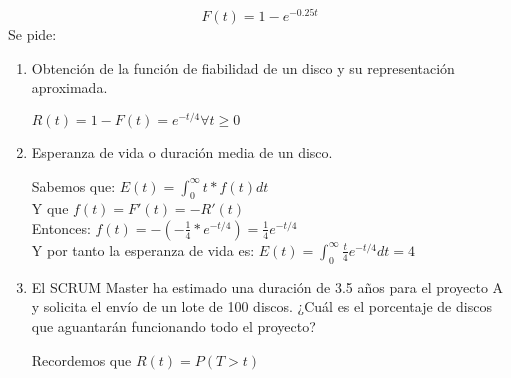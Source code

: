 \[F(t)=1-e^{-0.25t}\]
Se pide:
\begin{enumerate}
    \item Obtención de la función de fiabilidad de un disco y su representación aproximada.
    \begin{tcolorbox}[colback=white,colframe=cyan!50!black,fonttitle=\bfseries]
    $R(t) = 1 - F(t) = e^{-t/4}$\hspace{1cm}$\forall t \geq 0$\\
    \begin{center}
    \end{center}
        
    \end{tcolorbox}
    \item Esperanza de vida o duración media de un disco.
    \begin{tcolorbox}[colback=white,colframe=cyan!50!black,fonttitle=\bfseries]
    Sabemos que: $E(t)= \int_0^{\infty}t*f(t)dt$\\
    Y que $f(t) = F'(t) = -R'(t)$\\
    
    Entonces: $f(t) = -(-\frac{1}{4}*e^{-t/4})= \frac{1}{4}e^{-t/4}$\\
    
    Y por tanto la esperanza de vida es: $E(t)= \int_0^{\infty}\frac{t}{4}e^{-t/4}dt = 4$
    \end{tcolorbox}
    \item El SCRUM Master ha estimado una duración de 3.5 años para el proyecto A y solicita el envío de un lote de 100 discos. ¿Cuál es el porcentaje de discos que aguantarán funcionando todo el proyecto?
    \begin{tcolorbox}[colback=white,colframe=cyan!50!black,fonttitle=\bfseries]
    Recordemos que $R(t)= P(T>t)$\\
    

\end{tcolorbox}
\end{enumerate}
